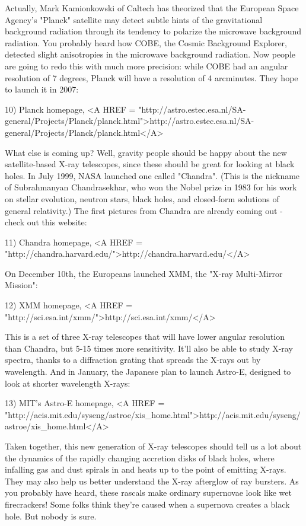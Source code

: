 Actually, Mark Kamionkowski of Caltech has theorized that the 
European Space Agency's "Planck" satellite may detect subtle  
hints of the gravitational background radiation through its tendency 
to polarize the microwave background radiation.  You probably heard 
how COBE, the Cosmic Background Explorer, detected slight anisotropies 
in the microwave background radiation.  Now people are going to redo 
this with much more precision: while COBE had an angular resolution 
of 7 degrees, Planck will have a resolution of 4 arcminutes.  They
hope to launch it in 2007:

10) Planck homepage, 
<A HREF = "http://astro.estec.esa.nl/SA-general/Projects/Planck/planck.html">http://astro.estec.esa.nl/SA-general/Projects/Planck/planck.html</A>

What else is coming up?  Well, gravity people should be happy about 
the new satellite-based X-ray telescopes, since these should be great 
for looking at black holes.  In July 1999, NASA launched one called 
"Chandra".  (This is the nickname of Subrahmanyan Chandrasekhar, who 
won the Nobel prize in 1983 for his work on stellar evolution, neutron 
stars, black holes, and closed-form solutions of general relativity.)
The first pictures from Chandra are already coming out - check out
this website:

11) Chandra homepage, <A HREF = "http://chandra.harvard.edu/">http://chandra.harvard.edu/</A>

On December 10th, the Europeans launched XMM, the "X-ray Multi-Mirror
Mission":

12) XMM homepage, <A HREF = "http://sci.esa.int/xmm/">http://sci.esa.int/xmm/</A>

This is a set of three X-ray telescopes that will have lower angular
resolution than Chandra, but 5-15 times more sensitivity.  It'll also
be able to study X-ray spectra, thanks to a diffraction grating that
spreads the X-rays out by wavelength.   And in January, the Japanese
plan to launch Astro-E, designed to look at shorter wavelength X-rays:

13) MIT's Astro-E homepage, <A HREF = "http://acis.mit.edu/syseng/astroe/xis_home.html">http://acis.mit.edu/syseng/astroe/xis_home.html</A>
 
Taken together, this new generation of X-ray telescopes should tell us
a lot about the dynamics of the rapidly changing accretion disks of
black holes, where infalling gas and dust spirals in and heats up to
the point of emitting X-rays.  They may also help us better understand 
the X-ray afterglow of \gamma  ray bursters.  As you probably have heard,
these rascals make ordinary supernovae look like wet firecrackers!
Some folks think they're caused when a supernova creates a black hole.
But nobody is sure.

